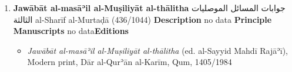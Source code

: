 \documentclass{article}
\begin{document}
\begin{enumerate}
      \item \textbf{Jawābāt al-masāʾil al-Muṣiliyāt al-thālitha}
        \newline
        \textarabic{جوابات المسائل الموصليات الثالثة}
        \newline
        al-Sharīf al-Murtaḍā
        \newline
        (436/1044)
        \newline
        \newline
        \textbf{Description}
        \newline	
        no data
        \newline
        \newline
    \textbf{Principle Manuscripts}
\newline
no data\newline\textbf{Editions}
\begin{itemize}
        \item \emph{Jawābāt al-masāʾil al-Muṣiliyāt al-thālitha} (ed. al-Sayyid Mahdī Rajāʾī), Modern print, Dār al-Qurʾān al-Karīm, Qum, 1405/1984
        \end{itemize}


\end{enumerate}
\end{document}
